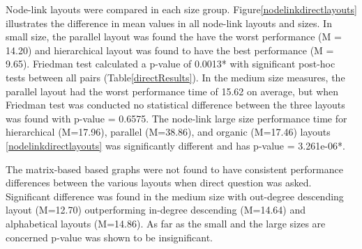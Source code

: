\documentclass{l4proj}
\begin{document}
Node-link layouts were compared in each size group. Figure\ref{nodelinkdirectlayouts} illustrates the difference in mean values in all node-link layouts and sizes. In small size, the parallel layout was found the have the worst performance (M = 14.20) and hierarchical layout was found to have the best performance (M = 9.65). Friedman test calculated a p-value of 0.0013* with significant post-hoc tests between all pairs (Table\ref{directResults}). In the medium size measures, the parallel layout had the worst performance time of 15.62 on average, but when Friedman test was conducted no statistical difference between the three layouts was found with p-value = 0.6575. The node-link large size performance time for hierarchical (M=17.96), parallel (M=38.86), and organic (M=17.46) layouts \ref{nodelinkdirectlayouts} was significantly different and has p-value = 3.261e-06*. 

The matrix-based based graphs were not found to have consistent performance differences between the various layouts when direct question was asked. Significant difference was found in the medium size with out-degree descending layout (M=12.70) outperforming in-degree descending (M=14.64) and alphabetical layouts (M=14.86). As far as the small and the large sizes are concerned p-value was shown to be insignificant.
\end{document}
